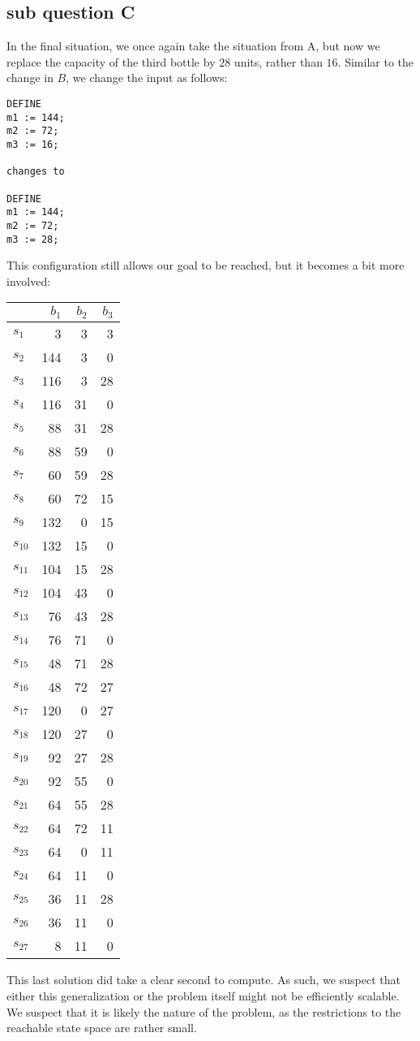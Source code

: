 \subsection{sub question C}
In the final situation, we once again take the situation from A, but now we replace the capacity of the third bottle by $28$ units, rather than $16$. Similar to the change in $B$, we change the input as follows:
\begin{verbatim}
DEFINE
m1 := 144;
m2 := 72;
m3 := 16;

changes to

DEFINE
m1 := 144;
m2 := 72;
m3 := 28;
\end{verbatim}
This configuration still allows our goal to be reached, but it becomes a bit more involved:\\
\begin{tabular}{ l | r  r  r }
   & $b_1$ & $b_2$ & $b_3$  \\
  \hline			
  $s_1$ & 3 & 3 & 3 \\ 
  $s_2$ & 144 & 3 & 0 \\ 
  $s_3$ & 116 & 3 & 28 \\ 
  $s_4$ & 116 & 31 & 0 \\ 
  $s_5$ & 88 & 31 & 28 \\ 
  $s_6$ & 88 & 59 & 0 \\ 
  $s_7$ & 60 & 59 & 28 \\ 
  $s_8$ & 60 & 72 & 15 \\ 
  $s_9$ & 132 & 0 & 15 \\ 
  $s_{10}$ & 132 & 15 & 0 \\ 
  $s_{11}$ & 104 & 15 & 28 \\ 
  $s_{12}$ & 104 & 43 & 0 \\ 
  $s_{13}$ & 76 & 43 & 28 \\ 
  $s_{14}$ & 76 & 71 & 0 \\ 
  $s_{15}$ & 48 & 71 & 28 \\ 
  $s_{16}$ & 48 & 72 & 27 \\ 
  $s_{17}$ & 120 & 0 & 27 \\ 
  $s_{18}$ & 120 & 27 & 0 \\ 
  $s_{19}$ & 92 & 27 & 28 \\ 
  $s_{20}$ & 92 & 55 & 0 \\ 
  $s_{21}$ & 64 & 55 & 28 \\ 
  $s_{22}$ & 64 & 72 & 11 \\ 
  $s_{23}$ & 64 & 0 & 11 \\ 
  $s_{24}$ & 64 & 11 & 0 \\ 
  $s_{25}$ & 36 & 11 & 28 \\ 
  $s_{26}$ & 36 & 11 & 0 \\ 
  $s_{27}$ & 8 & 11 & 0 \\ 
\end{tabular}
This last solution did take a clear second to compute. As such, we suspect that either this generalization or the problem itself might not be efficiently scalable. We suspect that it is likely the nature of the problem, as the restrictions to the reachable state space are rather small.

